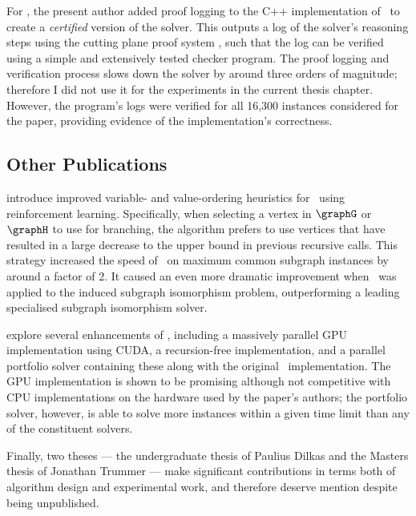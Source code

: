 For \citet{DBLP:conf/cp/GochtMMNPT20}, the present
author added proof logging \citep{DBLP:conf/ijcai/GochtMN20} to the C++ implementation of
\McSplit\ to create a \emph{certified} version of the solver.  This outputs a log of the
solver's reasoning steps using the cutting plane proof system
\citep{DBLP:journals/dam/CookCT87}, such that the log can be verified using a
simple and extensively tested checker program.  The proof logging and verification process
slows down the solver by around three orders of magnitude; therefore I did not use it for
the experiments in the current thesis chapter.  However, the program's logs were verified
for all 16,300 instances considered for the paper, providing evidence of the implementation's
correctness.

\subsection{Other Publications}

\citet{DBLP:conf/aaai/0001LJ020} introduce improved variable- and value-ordering
heuristics for \McSplit\ using reinforcement learning.
Specifically, when selecting a vertex in $\graphG$ or $\graphH$ to use for branching,
the algorithm prefers to use vertices that have resulted in a large decrease to the upper bound
in previous recursive calls.  This strategy increased the speed of \McSplit\ on maximum common subgraph
instances by around a factor of 2.  It caused an even more dramatic improvement when \McSplit\ was
applied to the induced subgraph isomorphism problem, outperforming a leading specialised subgraph
isomorphism solver.

\citet{DBLP:journals/computation/QuerMS20}
explore several enhancements of \McSplit,
including a massively parallel GPU implementation using CUDA, a recursion-free implementation,
and a parallel portfolio solver containing these along with the original \McSplit\
implementation.  The GPU implementation is shown to be promising although not competitive
with CPU implementations on the hardware used by the paper's authors; the portfolio solver,
however, is able to solve more instances within a given time limit than any of the
constituent solvers.

Finally, two theses --- the undergraduate thesis of Paulius Dilkas and
the Masters thesis of Jonathan Trummer --- make significant contributions
in terms both of algorithm design and experimental work, and therefore
deserve mention despite being unpublished.

